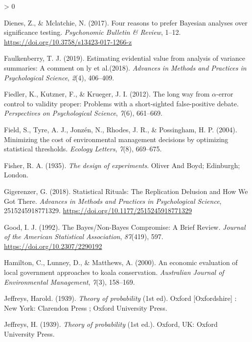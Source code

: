 \documentclass[
  english,
  ,jou,floatsintext]{apa6}
\newlength{\cslhangindent}
\newenvironment{CSLReferences}[2] %
 {%
  \setlength{\parindent}{0pt}
  \ifodd #1 \everypar{\setlength{\hangindent}{\cslhangindent}}\ignorespaces\fi
  \ifnum #2 > 0
  \setlength{\parskip}{#2\baselineskip}
  \fi
 }%
 {}
\begin{document}
\begin{CSLReferences}{1}{0}
\leavevmode\hypertarget{ref-dienes_four_2017}{}%
Dienes, Z., \& Mclatchie, N. (2017). Four reasons to prefer {Bayesian} analyses over significance testing. \emph{Psychonomic Bulletin \& Review}, 1--12. \url{https://doi.org/10.3758/s13423-017-1266-z}

\leavevmode\hypertarget{ref-faulkenberry2019estimating}{}%
Faulkenberry, T. J. (2019). Estimating evidential value from analysis of variance summaries: A comment on ly et al.(2018). \emph{Advances in Methods and Practices in Psychological Science}, \emph{2}(4), 406--409.

\leavevmode\hypertarget{ref-fiedler2012long}{}%
Fiedler, K., Kutzner, F., \& Krueger, J. I. (2012). The long way from \(\alpha\)-error control to validity proper: Problems with a short-sighted false-positive debate. \emph{Perspectives on Psychological Science}, \emph{7}(6), 661--669.

\leavevmode\hypertarget{ref-field2004minimizing}{}%
Field, S., Tyre, A. J., Jonzén, N., Rhodes, J. R., \& Possingham, H. P. (2004). Minimizing the cost of environmental management decisions by optimizing statistical thresholds. \emph{Ecology Letters}, \emph{7}(8), 669--675.

\leavevmode\hypertarget{ref-fisher_design_1935}{}%
Fisher, R. A. (1935). \emph{The design of experiments}. {Oliver And Boyd; Edinburgh; London}.

\leavevmode\hypertarget{ref-gigerenzer_statistical_2018}{}%
Gigerenzer, G. (2018). Statistical {Rituals}: {The Replication Delusion} and {How We Got There}. \emph{Advances in Methods and Practices in Psychological Science}, 2515245918771329. \url{https://doi.org/10.1177/2515245918771329}

\leavevmode\hypertarget{ref-good_bayesux2fnon-bayes_1992}{}%
Good, I. J. (1992). The {Bayes}/{Non}-{Bayes Compromise}: {A Brief Review}. \emph{Journal of the American Statistical Association}, \emph{87}(419), 597. \url{https://doi.org/10.2307/2290192}

\leavevmode\hypertarget{ref-hamilton2000economic}{}%
Hamilton, C., Lunney, D., \& Matthews, A. (2000). An economic evaluation of local government approaches to koala conservation. \emph{Australian Journal of Environmental Management}, \emph{7}(3), 158--169.

\leavevmode\hypertarget{ref-jeffreys_theory_1939}{}%
Jeffreys, Harold. (1939). \emph{Theory of probability} (1st ed). {Oxford {[}Oxfordshire{]} : New York}: {Clarendon Press ; Oxford University Press}.

\leavevmode\hypertarget{ref-Jeffreys1939}{}%
Jeffreys, H. (1939). \emph{Theory of probability} (1st ed.). Oxford, UK: Oxford University Press.


\end{CSLReferences}
\end{document}
